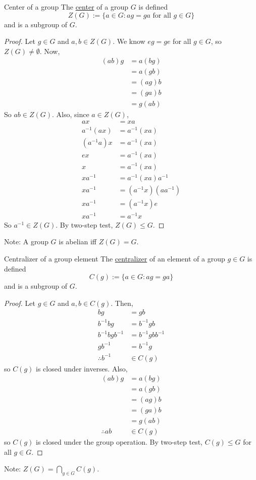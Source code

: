 \documentclass[12pt]{article}
\newcommand{\inv}{^{-1}}
\begin{document}
	\begin{myex}{Center of a group}{}
		The \underline{center} of a group $G$ is defined $$Z(G):=\{a\in G:ag=ga\text{ for all }g\in G\}$$
		and is a subgroup of $G$.
		\begin{proof}
			Let $g\in G$ and $a, b\in Z(G)$. We know $eg=ge$ for all $g\in G$, so $Z(G)\neq\emptyset$. Now,
			\begin{align*}
				(ab)g&=a(bg)\\
				&=a(gb)\\
				&=(ag)b\\
				&=(ga)b\\
				&=g(ab)
			\end{align*}
			So $ab\in Z(G)$. Also, since $a\in Z(G)$,
			\begin{align*}
				ax&=xa\\
				a\inv(ax)&=a\inv(xa)\\
				(a\inv a)x&=a\inv(xa)\\
				ex&=a\inv(xa)\\
				x&=a\inv(xa)\\
				xa\inv&=a\inv(xa)a\inv\\
				xa\inv&=(a\inv x)(aa\inv)\\
				xa\inv&=(a\inv x)e\\
				xa\inv&=a\inv x
			\end{align*}
			So $a\inv\in Z(G)$. By two-step test, $Z(G)\leq G$.
		\end{proof}
		
		Note: A group $G$ is abelian iff $Z(G)=G$.
	\end{myex}
	
	\begin{myex}{Centralizer of a group element}{}
		The \underline{centralizer} of an element of a group $g\in G$ is defined $$C(g):=\{a\in G:ag=ga\}$$
		and is a subgroup of $G$.
		\begin{proof}
			Let $g\in G$ and $a, b\in C(g)$. Then,
			\begin{align*}
				bg&=gb\\
				b\inv bg&=b\inv gb\\
				b\inv bgb\inv&=b\inv gbb\inv\\
				gb\inv&=b\inv g\\
				\therefore b\inv&\in C(g)
			\end{align*}
			so $C(g)$ is closed under inverses. Also,
			\begin{align*}
				(ab)g&=a(bg)\\
				&=a(gb)\\
				&=(ag)b\\
				&=(ga)b\\
				&=g(ab)\\
				\therefore ab&\in C(g)
			\end{align*}
			so $C(g)$ is closed under the group operation. By two-step test, $C(g)\leq G$ for all $g\in G$.
		\end{proof}
		
		Note: $Z(G)=\bigcap_{g\in G}C(g)$.
	\end{myex}
	
\end{document}
